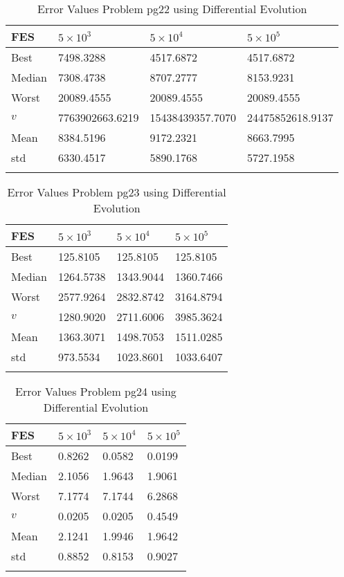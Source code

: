 \documentclass[10pt, a4paper]{book}
\begin{document}
\begin{center}
\begin{longtable}{l l l l}
FES & $5 \times 10^{3}$ & $5 \times 10^{4}$ & $5 \times 10^{5}$ \\
\hline
Best & 7498.3288 & 4517.6872 & 4517.6872 \\
Median & 7308.4738 & 8707.2777 & 8153.9231 \\
Worst & 20089.4555 & 20089.4555 & 20089.4555 \\
$v$ & 7763902663.6219 & 15438439357.7070 & 24475852618.9137 \\
Mean & 8384.5196 & 9172.2321 & 8663.7995 \\
std & 6330.4517 & 5890.1768 & 5727.1958 \\
\caption{ Error Values Problem pg22 using Differential Evolution }
\end{longtable}
\end{center}

\begin{center}
\begin{longtable}{l l l l}
FES & $5 \times 10^{3}$ & $5 \times 10^{4}$ & $5 \times 10^{5}$ \\
\hline
Best & 125.8105 & 125.8105 & 125.8105 \\
Median & 1264.5738 & 1343.9044 & 1360.7466 \\
Worst & 2577.9264 & 2832.8742 & 3164.8794 \\
$v$ & 1280.9020 & 2711.6006 & 3985.3624 \\
Mean & 1363.3071 & 1498.7053 & 1511.0285 \\
std & 973.5534 & 1023.8601 & 1033.6407 \\
\caption{ Error Values Problem pg23 using Differential Evolution }
\end{longtable}
\end{center}

\begin{center}
\begin{longtable}{l l l l}
FES & $5 \times 10^{3}$ & $5 \times 10^{4}$ & $5 \times 10^{5}$ \\
\hline
Best & 0.8262 & 0.0582 & 0.0199 \\
Median & 2.1056 & 1.9643 & 1.9061 \\
Worst & 7.1774 & 7.1744 & 6.2868 \\
$v$ & 0.0205 & 0.0205 & 0.4549 \\
Mean & 2.1241 & 1.9946 & 1.9642 \\
std & 0.8852 & 0.8153 & 0.9027 \\
\caption{ Error Values Problem pg24 using Differential Evolution }
\end{longtable}
\end{center}
\end{document}
